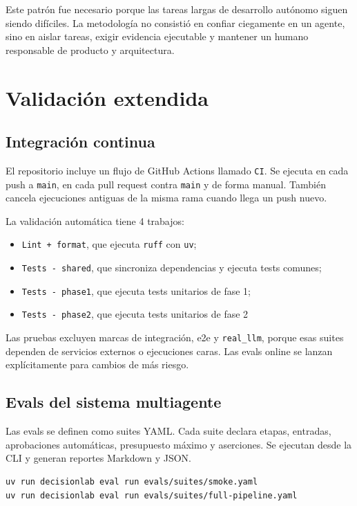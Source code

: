 Este patrón fue necesario porque las tareas largas de desarrollo autónomo
siguen siendo difíciles. La metodología no consistió en confiar ciegamente en
un agente, sino en aislar tareas, exigir evidencia ejecutable y mantener un
humano responsable de producto y arquitectura.

\section{Validación extendida}
\label{ap:validacion-extendida}

\subsection{Integración continua}

El repositorio incluye un flujo de GitHub Actions llamado \texttt{CI}. Se
ejecuta en cada push a \texttt{main}, en cada pull request contra \texttt{main}
y de forma manual. También cancela ejecuciones antiguas de la misma rama cuando
llega un push nuevo.

La validación automática tiene 4 trabajos:

\begin{itemize}
\item \texttt{Lint + format}, que ejecuta \texttt{ruff} con \texttt{uv};
\item \texttt{Tests - shared}, que sincroniza dependencias y ejecuta tests comunes;
\item \texttt{Tests - phase1}, que ejecuta tests unitarios de fase 1;
\item \texttt{Tests - phase2}, que ejecuta tests unitarios de fase 2
\end{itemize}

Las pruebas excluyen marcas de integración, e2e y \texttt{real\_llm}, porque
esas suites dependen de servicios externos o ejecuciones caras. Las evals
online se lanzan explícitamente para cambios de más riesgo.

\subsection{Evals del sistema multiagente}

Las evals se definen como suites YAML. Cada suite declara etapas, entradas,
aprobaciones automáticas, presupuesto máximo y aserciones. Se ejecutan desde la
CLI y generan reportes Markdown y JSON.

\begin{verbatim}
uv run decisionlab eval run evals/suites/smoke.yaml
uv run decisionlab eval run evals/suites/full-pipeline.yaml
\end{verbatim}

